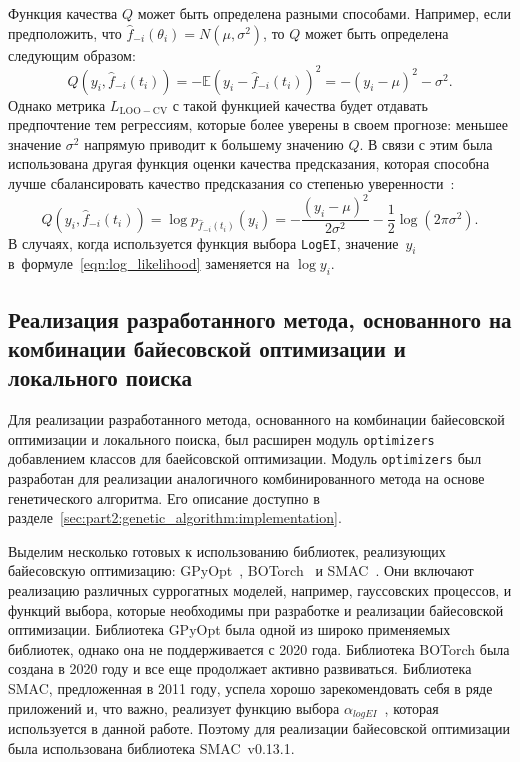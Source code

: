 Функция качества $Q$ может быть определена разными способами.
Например, если предположить, что $\hat{f}_{-i}(\theta_i) = N(\mu, \sigma^2)$, то $Q$ может быть определена следующим образом:
\[
Q(y_i, \hat{f}_{-i}(t_i))
=
- \mathbb{E} (y_i - \hat{f}_{-i}(t_i))^2
= - (y_i - \mu)^2 - \sigma^2.
\]
Однако метрика $L_{\mathrm{LOO-CV}}$ с такой функцией качества будет отдавать предпочтение тем регрессиям, которые более уверены в своем прогнозе: меньшее значение $\sigma^2$ напрямую приводит к большему значению $Q$.
В связи с этим была использована другая функция оценки качества предсказания, которая способна лучше сбалансировать качество предсказания со степенью уверенности~\cite{rasmussen2006}:
\begin{equation}
Q(y_i, \hat{f}_{-i}(t_i))
=
\log p_{\hat{f}_{-i}(t_i)}(y_i)
=
- \frac{(y_i - \mu)^2}{2\sigma^2}
- \frac{1}{2} \log(2 \pi \sigma^2).
\label{eqn:log_likelihood}
\end{equation}
В случаях, когда используется функция выбора \texttt{LogEI}, значение~$y_i$ в~формуле~\eqref{eqn:log_likelihood} заменяется на $\log y_i$.

\subsection{Реализация разработанного метода, основанного на комбинации байесовской оптимизации и локального поиска}
\label{sec:part2:bayesian_optimization:implementation}

Для реализации разработанного метода, основанного на комбинации байесовской оптимизации и локального поиска, был расширен модуль \texttt{optimizers} добавлением классов для баейсовской оптимизации.
Модуль \texttt{optimizers} был разработан для реализации  аналогичного комбинированного метода на основе генетического алгоритма. Его описание доступно в разделе~\ref{sec:part2:genetic_algorithm:implementation}.

Выделим несколько готовых к использованию библиотек, реализующих байесовскую оптимизацию: GPyOpt~\cite{gpyopt2016}, BOTorch~\cite{balandat2020botorch} и SMAC~\cite{hutter2011sequential, lindauer2022smac3}. 
Они включают реализацию различных суррогатных моделей, например, гауссовских процессов, и функций выбора, которые необходимы при разработке и реализации байесовской оптимизации.
Библиотека GPyOpt была одной из широко применяемых библиотек, однако она не поддерживается с 2020 года.
Библиотека BOTorch была создана в 2020 году и все еще продолжает активно развиваться.
Библиотека SMAC, предложенная в 2011 году, успела хорошо зарекомендовать себя в ряде приложений \cite{lago2018forecasting, hewamalage2021recurrent, wu2022nflat} и, что важно, реализует функцию выбора $\alpha_{logEI}$~\cite{hutter2009experimental}, которая используется в данной работе.
Поэтому для реализации байесовской оптимизации была использована библиотека SMAC~v0.13.1.

